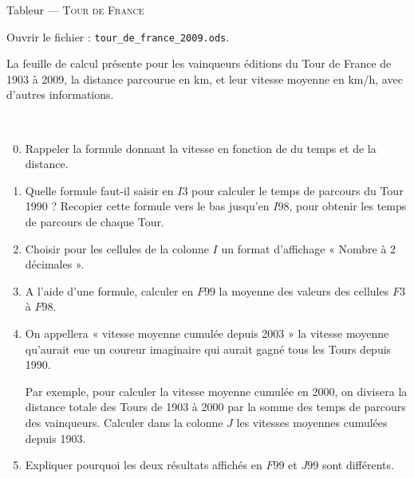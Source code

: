 \documentclass[11pt]{article}
\begin{document}
\begin{center}
  {\large
    Tableur
    ---
    \textsc{Tour de France}
  }
\end{center}

\noindent Ouvrir le fichier : \texttt{tour\_de\_france\_2009.ods}.

\noindent La feuille de calcul présente pour les vainqueurs éditions du Tour de France de 1903 à 2009, la distance parcourue en km, et leur vitesse moyenne en km/h, avec d'autres informations.



\begin{question}~

  \begin{enumerate}
      \setcounter{enumi}{-1}
    \item    Rappeler la formule donnant la vitesse en fonction de du temps et de la distance.
    \item Quelle formule faut-il saisir en $I3$ pour calculer le temps de parcours du Tour 1990 ?
      Recopier cette formule vers le bas jusqu'en $I98$, pour obtenir les temps de parcours de chaque Tour.

    \item    Choisir pour les cellules de la colonne $I$ un format d’affichage « Nombre à 2 décimales ».

    \item    A l’aide d’une formule, calculer en $F99$ la moyenne des valeurs des cellules $F3$ à $F98$.

    \item    On appellera « vitesse moyenne cumulée depuis 2003 » la vitesse moyenne qu’aurait eue un coureur imaginaire qui aurait gagné tous les Tours depuis 1990.

      Par exemple, pour calculer la vitesse moyenne cumulée en 2000, on divisera la distance totale des Tours de 1903 à 2000 par la somme des temps de parcours des vainqueurs.
      Calculer dans la colonne $J$ les vitesses moyennes cumulées depuis 1903.

    \item    Expliquer pourquoi les deux résultats affichés en $F99$ et $J99$ sont différents.

  \end{enumerate}
\end{question}
\end{document}
